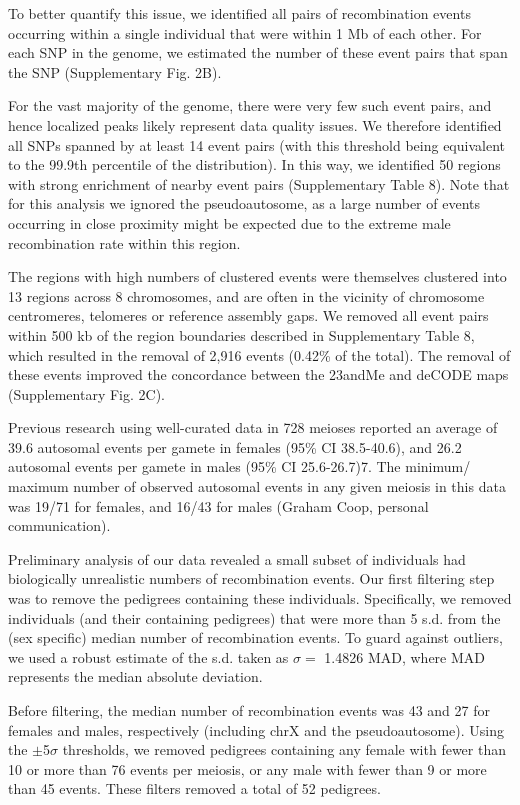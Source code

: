 To better quantify this issue, we identified all pairs of recombination events
occurring within a single individual that were within 1 Mb of each other. For each
SNP in the genome, we estimated the number of these event pairs that span the
SNP (Supplementary Fig. 2B).

For the vast majority of the genome, there were very few such event pairs, and
hence localized peaks likely represent data quality issues. We therefore identified all
SNPs spanned by at least 14 event pairs (with this threshold being equivalent 
to the 99.9th percentile of the distribution). In this way, we identified 50 regions
with strong enrichment of nearby event pairs (Supplementary Table 8). Note that
for this analysis we ignored the pseudoautosome, as a large number of events
occurring in close proximity might be expected due to the extreme male
recombination rate within this region.

The regions with high numbers of clustered events were themselves clustered
into 13 regions across 8 chromosomes, and are often in the vicinity of chromosome
centromeres, telomeres or reference assembly gaps. We removed all event pairs
within 500 kb of the region boundaries described in Supplementary Table 8, which
resulted in the removal of 2,916 events (0.42\% of the total). The removal of these
events improved the concordance between the 23andMe and deCODE maps
(Supplementary Fig. 2C).

Previous research using well-curated data in 728 meioses reported an average of
39.6 autosomal events per gamete in females (95\% CI 38.5-40.6), and 26.2
autosomal events per gamete in males (95\% CI 25.6-26.7)7. The minimum/
maximum number of observed autosomal events in any given meiosis in this
data was 19/71 for females, and 16/43 for males (Graham Coop, personal
communication).

Preliminary analysis of our data revealed a small subset of individuals had
biologically unrealistic numbers of recombination events. Our first filtering step
was to remove the pedigrees containing these individuals. Specifically, we removed
individuals (and their containing pedigrees) that were more than 5 s.d. from the
(sex specific) median number of recombination events. To guard against outliers,
we used a robust estimate of the s.d. taken as $\sigma=$ 1.4826 MAD, where MAD
represents the median absolute deviation.

Before filtering, the median number of recombination events was 43 and 27 for
females and males, respectively (including chrX and the pseudoautosome). Using
the $\pm$5$\sigma$ thresholds, we removed pedigrees containing any female with fewer than
10 or more than 76 events per meiosis, or any male with fewer than 9 or more than
45 events. These filters removed a total of 52 pedigrees.


